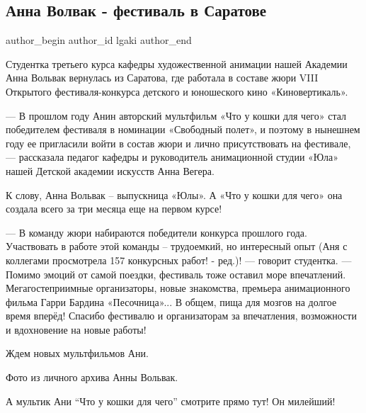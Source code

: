  
 
 
 
 
\subsection{Анна Волвак - фестиваль в Саратове}
\label{sec:15_10_2021.vk.lgaki.1.anna_volvak_festival_saratov}


\ifcmt
 author_begin
   author_id lgaki
 author_end
\fi

Студентка третьего курса кафедры художественной анимации нашей Академии Анна
Вольвак вернулась из Саратова, где работала в составе жюри VIII Открытого
фестиваля-конкурса детского и юношеского кино «Киновертикаль».


— В прошлом году Анин авторский мультфильм «Что у кошки для чего» стал
победителем фестиваля в номинации «Свободный полет», и поэтому в нынешнем году
ее пригласили войти в состав жюри и лично присутствовать на фестивале, —
рассказала педагог кафедры и руководитель анимационной студии «Юла» нашей
Детской академии искусств Анна Вегера.

К слову, Анна Вольвак – выпускница «Юлы». А «Что у кошки для чего» она создала
всего за три месяца еще на первом курсе!

— В команду жюри набираются победители конкурса прошлого года. Участвовать в
работе этой команды – трудоемкий, но интересный опыт (Аня с коллегами
просмотрела 157 конкурсных работ! - ред.)! — говорит студентка. — Помимо эмоций
от самой поездки, фестиваль тоже оставил море впечатлений. Мегагостеприимные
организаторы, новые знакомства, премьера анимационного фильма Гарри Бардина
«Песочница»... В общем, пища для мозгов на долгое время вперёд! Спасибо
фестивалю и организаторам за впечатления, возможности и вдохновение на новые
работы!

Ждем новых мультфильмов Ани.

Фото из личного архива Анны Вольвак.

А мультик Ани \enquote{Что у кошки для чего} смотрите прямо тут! Он милейший!
